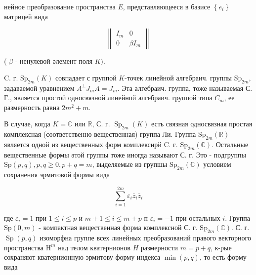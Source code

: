 \documentclass[10pt]{article}
\begin{document}
нейное преобразование пространства $E$, представляющееся в базисе $\left\{e_{i}\right\}$ матрицей вида



\[

\left\|\begin{array}{cc}

I_{m} & 0 \\

0 & \beta I_{m}

\end{array}\right\|

\]



( $\beta$ - ненулевой әлемент поля $K)$.



C. г. $\mathrm{Sp}_{2 m}(K)$ совпадает с группой $K$-точек линейной алгебраич. группы $\mathrm{Sp}_{2 m}$, задаваемой уравнением $A^{\perp} J_{m} A=J_{m}$. Эта алгебраич. группа, тоже называемая С. Г., является простой односвязной линейной алгебраич. группой типа $C_{m}$, ее размерность равна $2 m^{2}+m$.



В случае, когда $K=\mathbb{C}$ или $\mathbb{R}$, С. г. $\operatorname{Sp}_{2 m}(K)$ есть связная односвязная простая комплексная (соответственно вещественная) группа Ли. Группа $\mathrm{Sp}_{2 m}(\mathbb{R})$ является одной из вещественных форм комплекснрй C. г. $\mathrm{Sp}_{2 m}(\mathbb{C})$. Остальные вещественные формы әтой группы тоже иногда называют С. г. Это - подгруппы $\mathrm{Sp}(p, q), p, q \geqslant 0, p+q=m$, выделяемые из групшы $\mathrm{Sp}_{2 m}(\mathbb{C})$ условием сохранения эрмитовой формы вида



\[

\sum_{i=1}^{2 m} \varepsilon_{i} \bar{z}_{i} \bar{z}_{i}

\]



где $\varepsilon_{i}=1$ при $1 \leqslant i \leqslant p$ и $m+1 \leqslant i \leqslant m+p$ п $\varepsilon_{i}=-1$ при остальных $i$. Группа $\mathrm{Sp}(0, m)$ - компактная вещественная форма комплексной С. г. $\mathrm{Sp}_{2 m}(\mathbb{C})$. С. г. $\operatorname{Sp}(p, q)$ изоморфна группе всех линейных преобразований правого векторного пространства $\mathrm{H}^{m}$ над телом кватернионов $H$ размерности $m=p+q$, к-рые сохраняют кватернионную эрмитову форму индекса $\min (p, q)$, то есть форму вида
\end{document}
